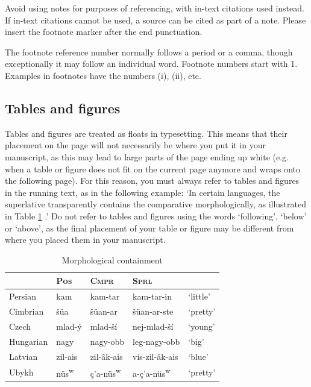 \documentclass[charis,linguex]{glossa}
\begin{document}
Avoid using notes for purposes of referencing, with in-text citations used instead. If in-text citations cannot be used, a source can be cited as part of a note. Please insert the footnote marker after the end punctuation.

The footnote reference number normally follows a period or a comma, though exceptionally it may follow an individual word. Footnote numbers start with 1. Examples in footnotes have the numbers (i), (ii), etc.

\subsection{Tables and figures}

Tables and figures are treated as floats in typesetting. This means that their placement on the page will not necessarily be where you put it in your manuscript, as this may lead to large parts of the page ending up white (e.g. when a table or figure does not fit on the current page anymore and wraps onto the following page). For this reason, you must always refer to tables and figures in the running text, as in the following example: `In certain languages, the superlative transparently contains the comparative morphologically, as illustrated in Table \ref{tbl:table1} \citep[46]{Bobaljik2012}.' Do not refer to tables and figures using the words `following', `below' or `above', as the final placement of your table or figure may be different from where you placed them in your manuscript.

\begin{table}[h]
\sffamily
\centering
\caption{Morphological containment}	
\begin{tabular}{lllll}
 & \textsc{Pos} & \textsc{Cmpr} & \textsc{Sprl}\\
\hline 
Persian & kam & kam-tar & kam-tar-in & ‘little’\\
Cimbrian & šüa & šüan-ar & šüan-ar-ste & ‘pretty’ \\
Czech & mlad-ý & mlad-ší & nej-mlad-ší & ‘young’\\
Hungarian & nagy & nagy-obb & leg-nagy-obb & ‘big’\\
Latvian & zil-ais & zil-âk-ais & vis-zil-âk-ais & ‘blue’\\
Ubykh &  nüs\textsuperscript{w}\textipa{@} & ç’a-nüs\textsuperscript{w}\textipa{@} & a-ç’a-nüs\textsuperscript{w}\textipa{@} & ‘pretty’ \\
\end{tabular}\label{tbl:table1}
\end{table}
\end{document}
